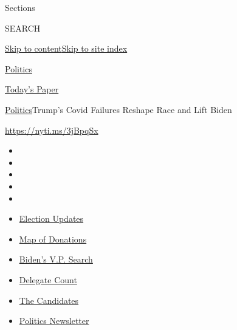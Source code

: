 Sections

SEARCH

\protect\hyperlink{site-content}{Skip to
content}\protect\hyperlink{site-index}{Skip to site index}

\href{https://www.nytimes3xbfgragh.onion/section/politics}{Politics}

\href{https://myaccount.nytimes3xbfgragh.onion/auth/login?response_type=cookie\&client_id=vi}{}

\href{https://www.nytimes3xbfgragh.onion/section/todayspaper}{Today's
Paper}

\href{/section/politics}{Politics}\textbar{}Trump's Covid Failures
Reshape Race and Lift Biden

\url{https://nyti.ms/3jBpqSx}

\begin{itemize}
\item
\item
\item
\item
\item
\end{itemize}

\begin{itemize}
\item
  \href{https://www.nytimes3xbfgragh.onion/2020/07/24/us/elections/2020-presidential-election.html?action=click\&pgtype=Article\&state=default\&module=styln-elections-2020\&region=TOP_BANNER\&context=storylines_menu}{Election
  Updates}
\item
  \href{https://www.nytimes3xbfgragh.onion/interactive/2020/07/24/us/politics/trump-biden-campaign-donors.html?action=click\&pgtype=Article\&state=default\&module=styln-elections-2020\&region=TOP_BANNER\&context=storylines_menu}{Map
  of Donations}
\item
  \href{https://www.nytimes3xbfgragh.onion/article/biden-vice-president-2020.html?action=click\&pgtype=Article\&state=default\&module=styln-elections-2020\&region=TOP_BANNER\&context=storylines_menu}{Biden's
  V.P. Search}
\item
  \href{https://www.nytimes3xbfgragh.onion/interactive/2020/us/elections/delegate-count-primary-results.html?action=click\&pgtype=Article\&state=default\&module=styln-elections-2020\&region=TOP_BANNER\&context=storylines_menu}{Delegate
  Count}
\item
  \href{https://www.nytimes3xbfgragh.onion/interactive/2019/us/politics/2020-presidential-candidates.html?action=click\&pgtype=Article\&state=default\&module=styln-elections-2020\&region=TOP_BANNER\&context=storylines_menu}{The
  Candidates}
\item
  \href{https://www.nytimes3xbfgragh.onion/newsletters/politics?action=click\&pgtype=Article\&state=default\&module=styln-elections-2020\&region=TOP_BANNER\&context=storylines_menu}{Politics
  Newsletter}
\end{itemize}

